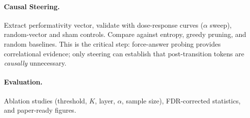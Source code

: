 \documentclass[11pt]{article}
\begin{document}
\paragraph{Causal Steering.} Extract performativity vector, validate with dose-response curves ($\alpha$ sweep), random-vector and sham controls. Compare against entropy, greedy pruning, and random baselines. This is the critical step: force-answer probing provides correlational evidence; only steering can establish that post-transition tokens are \emph{causally} unnecessary.

\paragraph{Evaluation.} Ablation studies (threshold, $K$, layer, $\alpha$, sample size), FDR-corrected statistics, and paper-ready figures.



\end{document}
